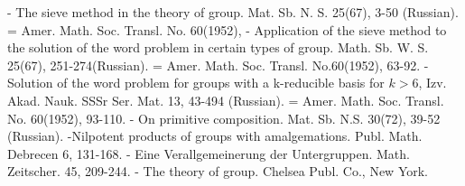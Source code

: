 \begin{thebibliography}{99}
- The sieve method in the
  theory of group. Mat. Sb. N. S. 25(67), 3-50 (Russian). =
  Amer. Math. Soc. Transl. No. 60(1952), 
- Application of the sieve
  method to the solution of the word problem in certain types of
  group. Math. Sb. W. S. 25(67), 251-274(Russian). =
  Amer. Math. Soc. Transl. No.60(1952), 63-92. 
- Solution of the word problem for groups
  with a k-reducible basis for $k > 6$, Izv. Akad. Nauk. SSSr
  Ser. Mat. 13, 43-494 (Russian). =
  Amer. Math. Soc. Transl. No. 60(1952), 93-110. 
- On primitive composition. Mat. Sb. N.S. 30(72),
  39-52 (Russian). 
-Nilpotent products of groups with
  amalgemations. Publ. Math. Debrecen 6, 131-168. 
- Eine Verallgemeinerung der
  Untergruppen. Math. Zeitscher. 45, 209-244. 
- The theory of group. Chelsea
  Publ. Co., New York.
\end{thebibliography}


